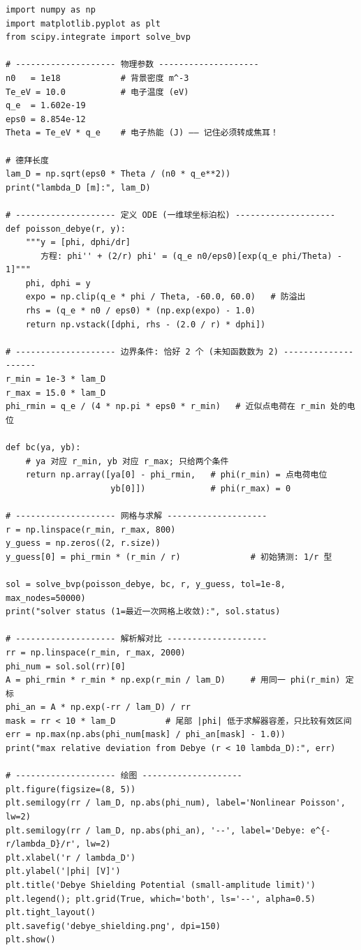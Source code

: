 \documentclass[12pt,a4paper,openany,oneside]{book}
\begin{document}
\begin{verbatim}
import numpy as np
import matplotlib.pyplot as plt
from scipy.integrate import solve_bvp

# -------------------- 物理参数 --------------------
n0   = 1e18            # 背景密度 m^-3
Te_eV = 10.0           # 电子温度 (eV)
q_e  = 1.602e-19
eps0 = 8.854e-12
Theta = Te_eV * q_e    # 电子热能 (J) —— 记住必须转成焦耳！

# 德拜长度
lam_D = np.sqrt(eps0 * Theta / (n0 * q_e**2))
print("lambda_D [m]:", lam_D)

# -------------------- 定义 ODE (一维球坐标泊松) --------------------
def poisson_debye(r, y):
    """y = [phi, dphi/dr]
       方程: phi'' + (2/r) phi' = (q_e n0/eps0)[exp(q_e phi/Theta) - 1]"""
    phi, dphi = y
    expo = np.clip(q_e * phi / Theta, -60.0, 60.0)   # 防溢出
    rhs = (q_e * n0 / eps0) * (np.exp(expo) - 1.0)
    return np.vstack([dphi, rhs - (2.0 / r) * dphi])

# -------------------- 边界条件: 恰好 2 个 (未知函数数为 2) --------------------
r_min = 1e-3 * lam_D
r_max = 15.0 * lam_D
phi_rmin = q_e / (4 * np.pi * eps0 * r_min)   # 近似点电荷在 r_min 处的电位

def bc(ya, yb):
    # ya 对应 r_min, yb 对应 r_max; 只给两个条件
    return np.array([ya[0] - phi_rmin,   # phi(r_min) = 点电荷电位
                     yb[0]])             # phi(r_max) = 0

# -------------------- 网格与求解 --------------------
r = np.linspace(r_min, r_max, 800)
y_guess = np.zeros((2, r.size))
y_guess[0] = phi_rmin * (r_min / r)              # 初始猜测: 1/r 型

sol = solve_bvp(poisson_debye, bc, r, y_guess, tol=1e-8, max_nodes=50000)
print("solver status (1=最近一次网格上收敛):", sol.status)

# -------------------- 解析解对比 --------------------
rr = np.linspace(r_min, r_max, 2000)
phi_num = sol.sol(rr)[0]
A = phi_rmin * r_min * np.exp(r_min / lam_D)     # 用同一 phi(r_min) 定标
phi_an = A * np.exp(-rr / lam_D) / rr
mask = rr < 10 * lam_D          # 尾部 |phi| 低于求解器容差，只比较有效区间
err = np.max(np.abs(phi_num[mask] / phi_an[mask] - 1.0))
print("max relative deviation from Debye (r < 10 lambda_D):", err)

# -------------------- 绘图 --------------------
plt.figure(figsize=(8, 5))
plt.semilogy(rr / lam_D, np.abs(phi_num), label='Nonlinear Poisson', lw=2)
plt.semilogy(rr / lam_D, np.abs(phi_an), '--', label='Debye: e^{-r/lambda_D}/r', lw=2)
plt.xlabel('r / lambda_D')
plt.ylabel('|phi| [V]')
plt.title('Debye Shielding Potential (small-amplitude limit)')
plt.legend(); plt.grid(True, which='both', ls='--', alpha=0.5)
plt.tight_layout()
plt.savefig('debye_shielding.png', dpi=150)
plt.show()
\end{verbatim}
\end{document}
